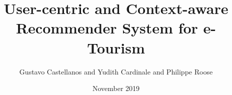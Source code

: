 \documentclass{article}
\title{User-centric and Context-aware  Recommender System for e-Tourism}
\author{Gustavo Castellanos and Yudith Cardinale and Philippe Roose }
\date{November 2019}
\begin{document}
\maketitle








\medskip
 
\printbibliography
\end{document}
